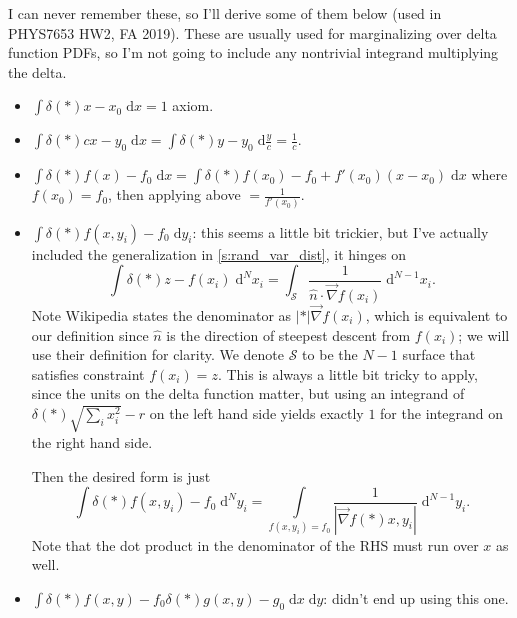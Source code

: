 \documentclass[12pt]{report}
\newcommand*{\abs}[1]{\left|#1\right|}
\newcommand*{\p}[1]{\left(#1\right)}
\begin{document}
I can never remember these, so I'll derive some of them below (used in PHYS7653
HW2, FA 2019). These are usually used for marginalizing over delta function
PDFs, so I'm not going to include any nontrivial integrand multiplying the
delta.
\begin{itemize}
    \item $\int \delta\p*{x - x_0}\;\mathrm{d}x = 1$ axiom.

    \item $\int \delta\p*{cx - y_0}\;\mathrm{d}x = \int \delta\p*{y -
        y_0}\;\mathrm{d}\frac{y}{c} = \frac{1}{c}$.

    \item $\int \delta\p*{f(x) - f_0}\;\mathrm{d}x = \int \delta\p*{f(x_0) - f_0
        + f'(x_0)(x - x_0)}\;\mathrm{d}x$ where $f(x_0) = f_0$, then applying
        above $= \frac{1}{f'(x_0)}$.

    \item $\int \delta\p*{f(x, y_i) - f_0}\;\mathrm{d}y_i$: this seems a little
        bit trickier, but I've actually included the generalization in
        \autoref{s:rand_var_dist}, it hinges on
        \begin{equation}
            \int \delta\p*{z - f(x_i)}\;\mathrm{d}^Nx_i =
                \int_{\mathcal{S}} \frac{1}{\hat{n} \cdot \vec{\nabla}
                    f(x_i)}\;\mathrm{d}^{N - 1}x_i.
        \end{equation}
        Note Wikipedia states the denominator as $\abs*{\vec{\nabla}f(x_i)}$,
        which is equivalent to our definition since $\hat{n}$ is the direction
        of steepest descent from $f(x_i)$; we will use their definition for
        clarity. We denote $\mathcal{S}$ to be the $N-1$ surface that satisfies
        constraint $f(x_i) = z$. This is always a little bit tricky to apply,
        since the units on the delta function matter, but using an integrand of
        $\delta\p*{\sqrt{\sum\limits_i x_i^2} - r}$ on the left hand side yields
        exactly $1$ for the integrand on the right hand side.

        Then the desired form is just
        \begin{equation}
            \int \delta\p*{f(x, y_i) - f_0}\;\mathrm{d}^Ny_i
                = \int\limits_{f(x, y_i) = f_0} \frac{1}{\abs{
                    \vec{\nabla} f\p*{x, y_i}}}\;\mathrm{d}^{N - 1}y_i.
        \end{equation}
        Note that the dot product in the denominator of the RHS must run over
        $x$ as well.

    \item $\int \delta\p*{f(x, y) - f_0} \delta\p*{g(x, y) -
        g_0}\;\mathrm{d}x\;\mathrm{d}y$: didn't end up using this one.
\end{itemize}
\end{document}
